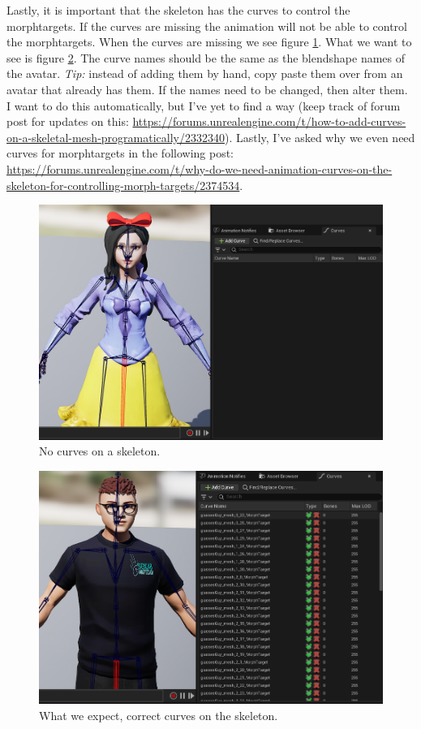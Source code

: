 \documentclass{uva-inf-article}
\begin{document}
Lastly, it is important that the skeleton has the curves to control the morphtargets. If the curves are missing the animation will not be able to control the morphtargets. When the curves are missing we see figure \ref{fig:noCurves}. What we want to see is figure \ref{fig:curves}. The curve names should be the same as the blendshape names of the avatar. \textit{Tip:} instead of adding them by hand, copy paste them over from an avatar that already has them. If the names need to be changed, then alter them. I want to do this automatically, but I've yet to find a way (keep track of forum post for updates on this: \url{https://forums.unrealengine.com/t/how-to-add-curves-on-a-skeletal-mesh-programatically/2332340}). Lastly, I've asked why we even need curves for morphtargets in the following post: \url{https://forums.unrealengine.com/t/why-do-we-need-animation-curves-on-the-skeleton-for-controlling-morph-targets/2374534}.
\begin{figure}[hbt!]
    \centering
    \includegraphics[width=\textwidth]{imgs/nocurves.png}
    \caption{No curves on a skeleton.}
    \label{fig:noCurves}
\end{figure}
\begin{figure}[hbt!]
    \centering
    \includegraphics[width=\textwidth]{imgs/curves.png}
    \caption{What we expect, correct curves on the skeleton.}
    \label{fig:curves}
\end{figure}
\end{document}
